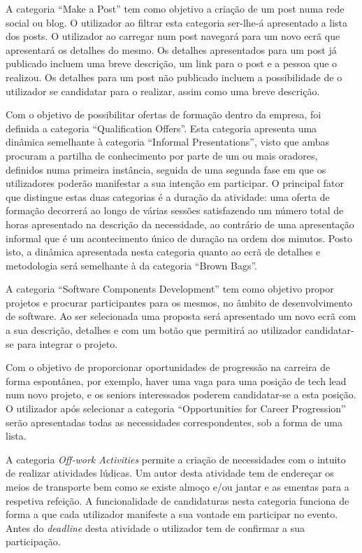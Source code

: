 A categoria “Make a Post” tem como objetivo a criação de um post numa rede social ou blog. 
O utilizador ao filtrar esta categoria ser-lhe-á apresentado a lista dos posts. 
O utilizador ao carregar num post navegará para um novo ecrã que apresentará os detalhes do mesmo. 
Os detalhes apresentados para um post já publicado incluem uma breve descrição, um link para o post e a pessoa que o realizou. 
Os detalhes para um post não publicado incluem a possibilidade de o utilizador se candidatar para o realizar, assim como uma breve descrição.

Com o objetivo de possibilitar ofertas de formação dentro da empresa, foi definida a categoria “Qualification Offers”. 
Esta categoria apresenta uma dinâmica semelhante à categoria “Informal Presentations”, visto que ambas procuram a partilha de 
conhecimento por parte de um ou mais oradores, definidos numa primeira instância, seguida de uma segunda fase em que os utilizadores 
poderão manifestar a sua intenção em participar. 
O principal fator que distingue estas duas categorias é a duração da atividade: 
uma oferta de formação decorrerá ao longo de várias sessões satisfazendo um número total de horas apresentado na descrição da necessidade, 
ao contrário de uma apresentação informal que é um acontecimento único de duração na ordem dos minutos. 
Posto isto, a dinâmica apresentada nesta categoria quanto ao ecrã de detalhes e metodologia será semelhante à da categoria “Brown Bags”.

A categoria “Software Components Development” tem como objetivo propor projetos e procurar participantes para os mesmos, no âmbito de desenvolvimento de software. 
Ao ser selecionada uma proposta será apresentado um novo ecrã com a sua descrição, detalhes e com um botão que permitirá ao utilizador 
candidatar-se para integrar o projeto.

Com o objetivo de proporcionar oportunidades de progressão na carreira de forma espontânea, por exemplo, 
haver uma vaga para uma posição de tech lead num novo projeto, e os seniors interessados poderem candidatar-se a esta posição. 
O utilizador após selecionar a categoria “Opportunities for Career Progression” serão apresentadas todas as necessidades correspondentes, sob a forma de uma lista.

A categoria \textit{Off-work Activities} permite a criação de necessidades com o intuito de realizar atividades lúdicas.
Um autor desta atividade tem de endereçar os meios de transporte bem como se existe almoço e/ou jantar e as ementas para a respetiva refeição. 
A funcionalidade de candidaturas nesta categoria funciona de forma a que cada utilizador manifeste a sua vontade em participar no evento.
Antes do \textit{deadline} desta atividade o utilizador tem de confirmar a sua participação.

